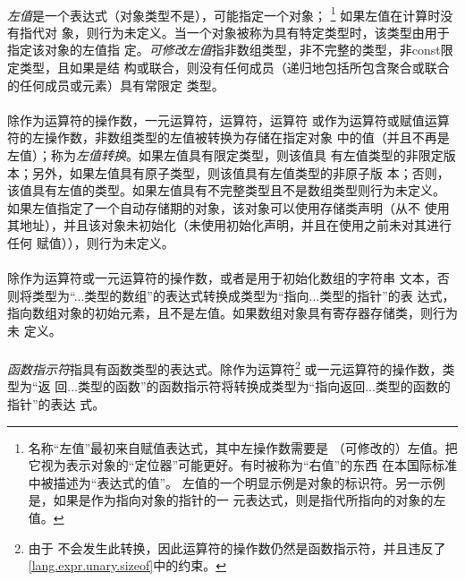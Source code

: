 \paragraph{}
\textit{左值}是一个表达式（对象类型不是），可能指定一个对象；
\footnote{名称``左值''最初来自赋值表达式，其中左操作数需要是
（可修改的）左值。把它视为表示对象的``定位器''可能更好。有时被称为``右值''的东西
在本国际标准中被描述为``表达式的值''。\linebreak
左值的一个明显示例是对象的标识符。另一示例是，如果是作为指向对象的指针的一
元表达式，则是指代所指向的对象的左值。} 如果左值在计算时没有指代对
象，则行为未定义。当一个对象被称为具有特定类型时，该类型由用于指定该对象的左值指
定。\textit{可修改左值}指非数组类型，非不完整的类型，非const限定类型，且如果是结
构或联合，则没有任何成员（递归地包括所包含聚合或联合的任何成员或元素）具有常限定
类型。

\paragraph{}
除作为运算符的操作数，一元\tm{\&}运算符，\tm{++}运算符，\tm{-}运算符
或作为运算符或赋值运算符的左操作数，非数组类型的左值被转换为存储在指定对象
中的值（并且不再是左值）；称为\textit{左值转换}。如果左值具有限定类型，则该值具
有左值类型的非限定版本；另外，如果左值具有原子类型，则该值具有左值类型的非原子版
本；否则，该值具有左值的类型。如果左值具有不完整类型且不是数组类型则行为未定义。
如果左值指定了一个自动存储期的对象，该对象可以使用存储类声明（从不
使用其地址），并且该对象未初始化（未使用初始化声明，并且在使用之前未对其进行任何
赋值）），则行为未定义。

\paragraph{}
除作为运算符或一元\tm{\&}运算符的操作数，或者是用于初始化数组的字符串
文本，否则将类型为``...类型的数组''的表达式转换成类型为``指向...类型的指针''的表
达式，指向数组对象的初始元素，且不是左值。如果数组对象具有寄存器存储类，则行为未
定义。

\paragraph{}
\textit{函数指示符}指具有函数类型的表达式。除作为运算符\footnote{由于
不会发生此转换，因此运算符的操作数仍然是函数指示符，并且违反了
\ref{lang.expr.unary.sizeof}中的约束。} 或一元\tm{\&}运算符的操作数，类型为``返
回...类型的函数''的函数指示符将转换成类型为``指向返回...类型的函数的指针''的表达
式。

